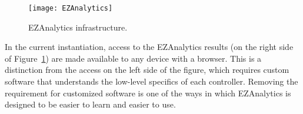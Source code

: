 \begin{figure}[htbp]
 \center
\texttt{[image: EZAnalytics]}
    \caption{EZAnalytics infrastructure.}
    \label{online}
\end{figure}

In the current instantiation, access to the EZAnalytics results (on the
right side of Figure~\ref{online}) are
made available to any device with a browser.  This is a distinction from
the access on the left side of the figure, which requires custom
software that understands the low-level specifics of each controller.
Removing the requirement for customized software is one of the ways
in which EZAnalytics is designed to be easier to learn and easier to use.
